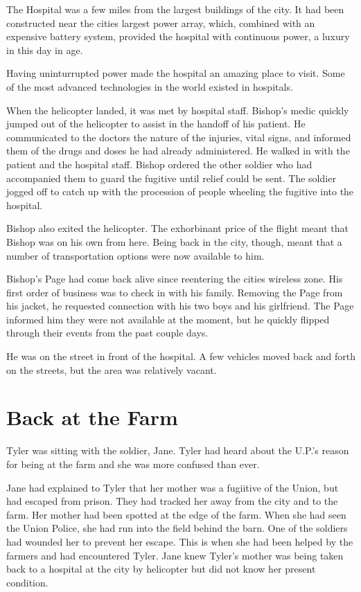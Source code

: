 \documentclass[courier]{sffms}
\begin{document}
The Hospital was a few miles from the largest
buildings of the city. It had been constructed
near the cities largest power array, which,
combined with an expensive battery system,
provided the hospital with continuous power, 
a luxury in this day in age.

Having uninturrupted power made the hospital
an amazing place to visit. Some of the most
advanced technologies in the world existed in
hospitals.

When the helicopter landed, it was met by
hospital staff. Bishop's medic quickly jumped
out of the helicopter to assist in the handoff
of his patient. He communicated to the doctors
the nature of the injuries, vital signs, and
informed them of the drugs and doses he
had already administered. He walked in with
the patient and the hospital staff. Bishop
ordered the other soldier who had accompanied
them to guard the fugitive until relief could
be sent. The soldier jogged off to catch up
with the procession of people wheeling the
fugitive into the hospital.

Bishop also exited the helicopter. The
exhorbinant price of the flight meant 
that Bishop was on his own from here.
Being back in the city, though, meant
that a number of transportation options
were now available to him.

Bishop's Page had come back alive since
reentering the cities wireless zone. His first
order of business was to check in with his
family. Removing the Page from his jacket,
he requested connection with his two boys
and his girlfriend. The Page informed him
they were not available at the moment,
but he quickly flipped through their events
from the past couple days.

He was on the street in front of the hospital.
A few vehicles moved back and forth on the
streets, but the area was relatively vacant.

\chapter{Back at the Farm}
Tyler was sitting with the soldier, Jane. Tyler
had heard about the U.P.'s reason for being
at the farm and she was more confused than
ever.

Jane had explained to Tyler that her mother
was a fugiitive of the Union, but had escaped
from prison. They had tracked her away from
the city and to the farm. Her mother had been
spotted at the edge of the farm. When she had
seen the Union Police, she had run into the field
behind the barn. One of the soldiers had wounded
her to prevent her escape. This is when she had
been helped by the farmers and had encountered
Tyler. Jane knew Tyler's mother was being taken
back to a hospital at the city by helicopter but did
not know her present condition.
\end{document}
